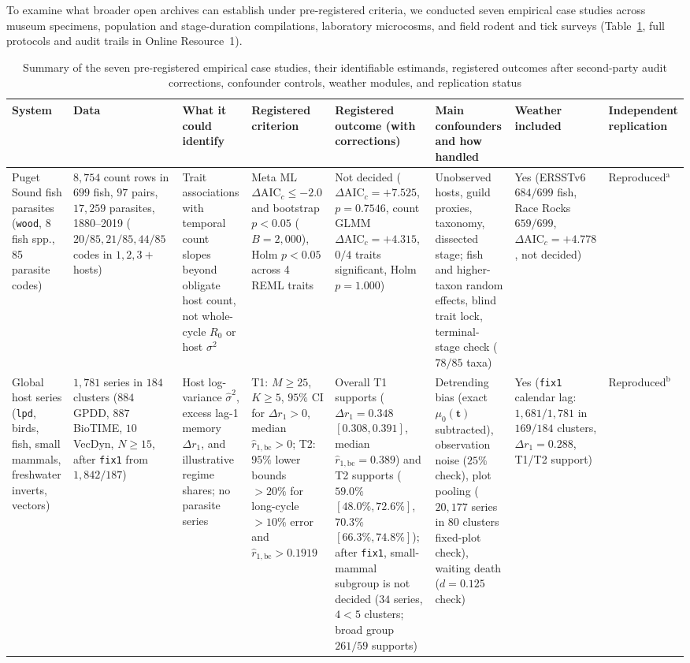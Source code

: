 To examine what broader open archives can establish under pre-registered criteria, we conducted seven empirical case studies across museum specimens, population and stage-duration compilations, laboratory microcosms, and field rodent and tick surveys (Table~\ref{num-tab-casestudies}, full protocols and audit trails in Online Resource~1).

\begin{table}[p]
\caption{Summary of the seven pre-registered empirical case studies, their identifiable estimands, registered outcomes after second-party audit corrections, confounder controls, weather modules, and replication status}\label{num-tab-casestudies}
{\tiny\setlength{\tabcolsep}{2pt}\renewcommand{\arraystretch}{1.12}
\begin{tabular}{@{}p{}p{}p{}p{}p{}p{}p{}p{}@{}}
\toprule
System & Data & What it could identify & Registered criterion & Registered outcome (with corrections) & Main confounders and how handled & Weather included & Independent replication \\
\midrule
Puget Sound fish parasites (\texttt{wood}, 8 fish spp., 85 parasite codes) & $8{,}754$ count rows in $699$ fish, $97$ pairs, $17{,}259$ parasites, 1880--2019 ($20/85, 21/85, 44/85$ codes in $1, 2, 3+$ hosts) & Trait associations with temporal count slopes beyond obligate host count, not whole-cycle $R_0$ or host $\sigma^2$ & Meta ML $\Delta\mathrm{AIC}_c \le -2.0$ and bootstrap $p < 0.05$ ($B = 2{,}000$), Holm $p < 0.05$ across 4 REML traits & Not decided ($\Delta\mathrm{AIC}_c = +7.525$, $p = 0.7546$, count GLMM $\Delta\mathrm{AIC}_c = +4.315$, $0/4$ traits significant, Holm $p = 1.000$) & Unobserved hosts, guild proxies, taxonomy, dissected stage; fish and higher-taxon random effects, blind trait lock, terminal-stage check ($78/85$ taxa) & Yes (ERSSTv6 $684/699$ fish, Race Rocks $659/699$, $\Delta\mathrm{AIC}_c = +4.778$, not decided) & Reproduced$^{\mathrm{a}}$ \\
Global host series (\texttt{lpd}, birds, fish, small mammals, freshwater inverts, vectors) & $1{,}781$ series in $184$ clusters ($884$ GPDD, $887$ BioTIME, $10$ VecDyn, $N \ge 15$, after \texttt{fix1} from $1{,}842/187$) & Host log-variance $\hat{\sigma}^2$, excess lag-1 memory $\Delta r_1$, and illustrative regime shares; no parasite series & T1: $M \ge 25$, $K \ge 5$, $95\%$ CI for $\Delta r_1 > 0$, median $\hat{r}_{1,\mathrm{bc}} > 0$; T2: $95\%$ lower bounds $> 20\%$ for long-cycle $>10\%$ error and $\hat{r}_{1,\mathrm{bc}} > 0.1919$ & Overall T1 supports ($\Delta r_1 = 0.348$ $[0.308, 0.391]$, median $\hat{r}_{1,\mathrm{bc}} = 0.389$) and T2 supports ($59.0\%$ $[48.0\%, 72.6\%]$, $70.3\%$ $[66.3\%, 74.8\%]$); after \texttt{fix1}, small-mammal subgroup is not decided ($34$ series, $4 < 5$ clusters; broad group $261/59$ supports) & Detrending bias (exact $\mu_0(\mathbf{t})$ subtracted), observation noise ($25\%$ check), plot pooling ($20{,}177$ series in $80$ clusters fixed-plot check), waiting death ($d = 0.125$ check) & Yes (\texttt{fix1} calendar lag: $1{,}681/1{,}781$ in $169/184$ clusters, $\Delta r_1 = 0.288$, T1/T2 support) & Reproduced$^{\mathrm{b}}$ \\

\end{tabular}}
\end{table}
